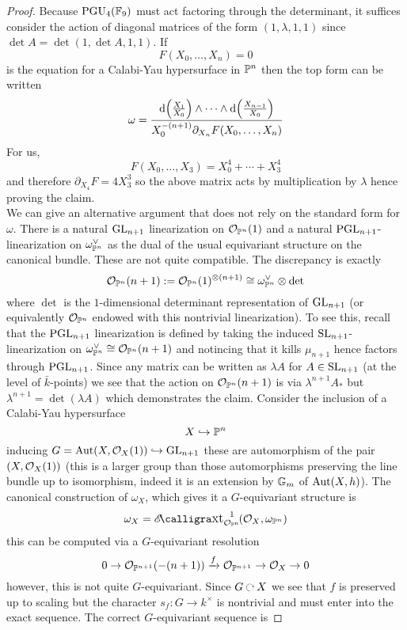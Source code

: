 \documentclass[12pt]{article}
\begin{document}
\begin{proof}
Because $\PGU_4(\FF_9)$ must act factoring through the determinant, it suffices consider the action of diagonal matrices of the form $(1,\lambda,1,1)$ since $\det{A} = \det{(1,\det{A},1,1)}$. If
\[ F(X_0, \dots, X_n) = 0 \]
is the equation for a Calabi-Yau hypersurface in $\P^n$ then the top form can be written
\[ \omega = \frac{\d{\left( \tfrac{X_1}{X_0} \right)} \wedge \cdots \wedge \d{\left( \tfrac{X_{n-1}}{X_0} \right)}}{X_0^{-(n+1)} \partial_{X_n} F(X_0, \dots, X_n)} \]
For us, 
\[ F(X_0, \dots, X_3) = X_0^4 + \cdots + X_3^4 \]
and therefore $\partial_{X_4} F = 4 X_3^3$ so the above matrix acts by multiplication by $\lambda$ hence proving the claim.
\bigskip\\  
We can give an alternative argument that does not rely on the standard form for $\omega$. There is a natural $\GL_{n+1}$ linearization on $\struct{\P^{n}}(1)$ and a natural $\PGL_{n+1}$-linearization on $\omega_{\P^{n}}^\vee$ as the dual of the usual equivariant structure on the canonical bundle. These are not quite compatible. The discrepancy is exactly 
\[ \struct{\P^n}(n+1) := \struct{\P^n}(1)^{\ot (n+1)} \cong \omega_{\P^n}^{\vee} \ot \det \]
where $\det$ is the $1$-dimensional determinant representation of $\GL_{n+1}$ (or equivalently $\struct{\P^n}$ endowed with this nontrivial linearization). To see this, recall that the $\PGL_{n+1}$ linearization is defined by taking the induced $\SL_{n+1}$-linearization on $\omega_{\P^n}^\vee \cong \struct{\P^n}(n+1)$ and notincing that it kills $\mu_{n+1}$ hence factors through $\PGL_{n+1}$. Since any matrix can be written as $\lambda A$ for $A \in \SL_{n+1}$ (at the level of $\bar{k}$-points) we see that the action on $\struct{\P^n}(n+1)$ is via $\lambda^{n+1} A_*$ but $\lambda^{n+1} = \det{(\lambda A)}$ which demonstrates the claim. Consider the inclusion of a Calabi-Yau hypersurface
\[ X \embed \P^n \]
inducing $G = \Aut(X,\struct{X}(1)) \embed \GL_{n+1}$ these are automorphism of the pair $(X, \struct{X}(1))$ (this is a larger group than those automorphisms preserving the line bundle up to isomorphism, indeed it is an extension by $\Gm$ of $\Aut(X,h)$). The canonical construction of $\omega_X$, which gives it a $G$-equivariant structure is
\[ \omega_X = \shExt{1}{\struct{\P^n}}{\struct{X}}{\omega_{\P^n}} \]
this can be computed via a $G$-equivariant resolution
\[ 0 \to \struct{\P^{n+1}}(-(n+1)) \xrightarrow{f} \struct{\P^{n+1}} \to \struct{X} \to 0 \]
however, this is not quite $G$-equivariant. Since $G \acts X$ we see that $f$ is preserved up to scaling but the character $s_f : G \to k^\times$ is nontrivial and must enter into the exact sequence. The correct $G$-equivariant sequence is

\end{proof}
\end{document}
